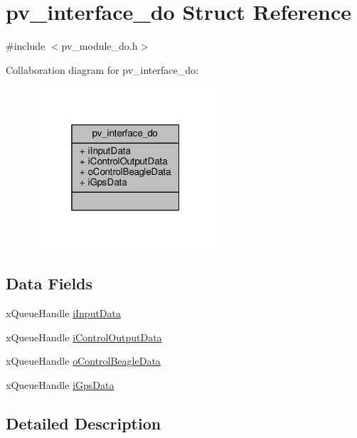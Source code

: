 \hypertarget{structpv__interface__do}{}\section{pv\+\_\+interface\+\_\+do Struct Reference}
\label{structpv__interface__do}


{\ttfamily \#include $<$pv\+\_\+module\+\_\+do.\+h$>$}



Collaboration diagram for pv\+\_\+interface\+\_\+do\+:\nopagebreak
\begin{figure}[H]
\begin{center}
\leavevmode
\includegraphics[width=193pt]{structpv__interface__do__coll__graph}
\end{center}
\end{figure}
\subsection*{Data Fields}
\begin{DoxyCompactItemize}
\item 
x\+Queue\+Handle \hyperlink{structpv__interface__do_ad057767ef15274f0933ad1821fea7239}{i\+Input\+Data}
\item 
x\+Queue\+Handle \hyperlink{structpv__interface__do_a47359dc53fe6c9e48eae67c40f5bde8a}{i\+Control\+Output\+Data}
\item 
x\+Queue\+Handle \hyperlink{structpv__interface__do_a4ed79d3529d7b97899602893078332b0}{o\+Control\+Beagle\+Data}
\item 
x\+Queue\+Handle \hyperlink{structpv__interface__do_a98e72320f39ff4a7ec39da06b878ff1b}{i\+Gps\+Data}
\end{DoxyCompactItemize}


\subsection{Detailed Description}



